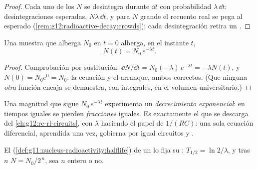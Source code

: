 \begin{proof}
Cada uno de los $N$  se desintegra durante $\dd t$ con probabilidad
$\lambda\,\dd t$: desintegraciones esperadas, $N\lambda\,\dd t$, y para $N$ grande el
recuento real se pega al esperado (\cref{rem:g12:radioactive-decay:crowds}); cada
desintegración retira un .
\end{proof}

\begin{theorem}\label{thm:g12:radioactive-decay:law}
Una muestra que alberga $N_0$  en $t = 0$ alberga, en el instante $t$,
\[
N(t) = N_0 \, e^{-\lambda t}.
\]
\end{theorem}

\begin{proof}
Comprobación por sustitución:
$\dd N/\dd t = N_0(-\lambda)\,e^{-\lambda t} = -\lambda N(t)$, y
$N(0) = N_0 e^0 = N_0$: la ecuación y el arranque, ambos correctos. (Que ninguna
\emph{otra} función encaja se demuestra, con integrales, en el volumen
universitario.)
\end{proof}

\begin{definition}\label{def:g12:radioactive-decay:exponential}
Una magnitud que sigue $N_0\,e^{-\lambda t}$ experimenta un \emph{decrecimiento
exponencial}: en tiempos iguales se pierden
\emph{fracciones} iguales. Es exactamente el  que se descarga del
\cref{ch:g12:rc-rl-circuits}, con $\lambda$ haciendo el papel de $1/(RC)$: una sola
ecuación diferencial, aprendida una vez, gobierna por igual circuitos y .
\end{definition}

\begin{proposition}\label{prop:g12:radioactive-decay:halflife}
El 
(\cref{def:g11:nucleus-radioactivity:halflife}) de un  lo fija su : $T_{1/2} = \ln 2/\lambda$, y tras $n$ 
$N = N_0/2^{\,n}$, sea $n$ entero o no.
\end{proposition}

